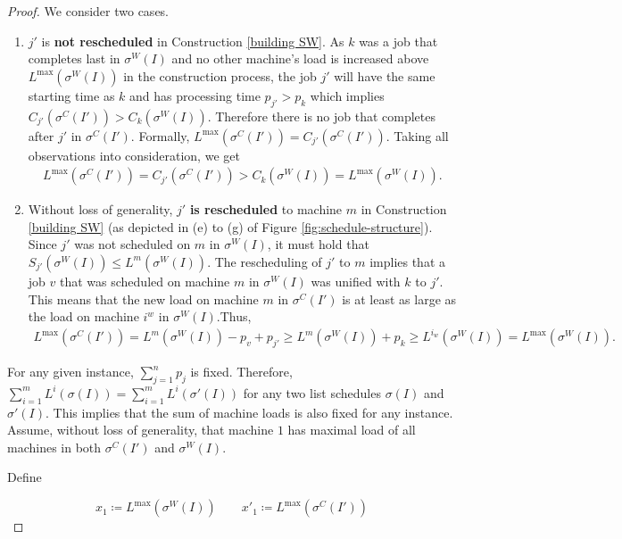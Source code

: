 \documentclass[%
english, titlepage=false %
]{./tum-templates/book/tumbook}
\begin{document}
\begin{proof}
We consider two cases.
\begin{enumerate}
    \item   $j'$ is \textbf{not rescheduled} in Construction \ref{building SW}. As $k$ was a job that completes last in $\sigma^{W}(I)$ and no other machine's load
            is increased above $L^{\max}(\sigma^{W}(I))$ in the construction process, the job $j'$ will have the same starting time as $k$ and 
            has processing time $p_{j'} > p_k$ which implies $C_{j'}(\sigma^{C}(I')) > C_{k}(\sigma^{W}(I))$. Therefore there is no job that completes after $j'$ in $\sigma^{C}(I')$.
            Formally, $L^{\max}(\sigma^{C}(I')) = C_{j'}(\sigma^{C}(I'))$.
            Taking all observations into consideration, we get 
            \begin{align*}
            L^{\max}(\sigma^{C}(I'))=C_{j'}(\sigma^{C}(I')) > C_{k}(\sigma^{W}(I))=L^{\max}(\sigma^{W}(I)).
            \end{align*}
    \item   Without loss of generality, $j'$ \textbf{is rescheduled} to machine $m$ in Construction \ref{building SW}
            (as depicted in (e) to (g) of Figure \ref{fig:schedule-structure}). Since $j'$ was not scheduled on $m$ in $\sigma^{W}(I)$, it must hold that $S_{j'}(\sigma^{W}(I))\le L^{m}(\sigma^{W}(I))$. 
            The rescheduling of $j'$ to $m$ implies that a job $v$
            that was scheduled on machine $m$ in $\sigma^{W}(I)$ was unified with $k$ to $j'$. This means that the new load on machine $m$ in $\sigma^C(I')$ is at least 
            as large as the load on machine $i^{w}$ in $\sigma^{W}(I)$.Thus, 
            \begin{align*}
            L^{\max}(\sigma^{C}(I')) = L^{m}(\sigma^{W}(I))-p_{v} +p_{j'} \ge L^{m}(\sigma^{W}(I)) + p_{k} \ge L^{i_w}(\sigma^{W}(I)) = L^{\max}(\sigma^{W}(I)).
            \end{align*}
\end{enumerate}


For any given instance, $\sum_{j=1}^{n}p_j$ is fixed. Therefore, $\sum_{i=1}^{m}L^{i}(\sigma(I)) = \sum_{i=1}^{m}L^{i}(\sigma'(I))$ for any two list schedules $\sigma(I)$ and $\sigma'(I)$.
This implies that the sum of machine loads is also fixed for any instance. Assume, without loss of generality, 
that machine $1$ has maximal load of all machines in both $\sigma^{C}(I')$ and $\sigma^{W}(I)$. 

\noindent
Define

\[x_1 \coloneqq L^{\max}(\sigma^{W}(I)) \qquad x'_1 \coloneqq L^{\max}(\sigma^{C}(I'))\]


\end{proof}
\end{document}
